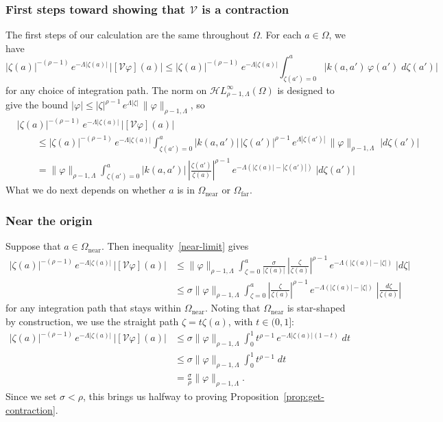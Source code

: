 \documentclass[final]{siamart220329}
\newcommand{\singexp}[2]{\mathcal{H}L^\infty_{#1, #2}}
\newcommand{\volterra}{\mathcal{V}}
\newcommand{\domain}{\Omega}
\newcommand{\near}{\Omega_\text{near}}
\newcommand{\far}{\Omega_\text{far}}
\newenvironment{revtwo}{\color{revred}}{\color{black}}
\newenvironment{revtwo}{}{}
\begin{document}
\subsubsection{First steps toward showing that $\volterra$ is a contraction}\label{first-steps}
The first steps of our calculation are the same throughout $\domain$. For each $a \in \domain$, we have
\begin{revtwo}
\[ |\zeta(a)|^{-(\rho-1)}\,e^{-\Lambda|\zeta(a)|}\,\big|[\volterra\varphi](a)\big| \le |\zeta(a)|^{-(\rho-1)}\,e^{-\Lambda|\zeta(a)|}  \int_{\zeta(a') = 0}^a |k(a, a')\,\varphi(a')\;d\zeta(a')| \]
\end{revtwo}
for any choice of integration path. The norm on $\singexp{\rho-1}{\Lambda}(\domain)$ is designed to give the bound $|\varphi| \le |\zeta|^{\rho-1}\,e^{\Lambda |\zeta|}\,\|\varphi\|_{\rho-1, \Lambda}$, so
\begin{revtwo}
\begin{align*}
&|\zeta(a)|^{-(\rho-1)}\,e^{-\Lambda|\zeta(a)|}\,\big|[\volterra\varphi](a)\big| \\
& \qquad \le |\zeta(a)|^{-(\rho-1)}\,e^{-\Lambda|\zeta(a)|}  \int_{\zeta(a') = 0}^a |k(a, a')|\,|\zeta(a')|^{\rho-1}\,e^{\Lambda |\zeta(a')|}\,\|\varphi\|_{\rho-1, \Lambda}\;|d\zeta(a')| \\
& \qquad = \|\varphi\|_{\rho-1, \Lambda}  \int_{\zeta(a') = 0}^a |k(a, a')|\,\left|\frac{\zeta(a')}{\zeta(a)}\right|^{\rho-1}\,e^{-\Lambda(|\zeta(a)| - |\zeta(a')|)}\;|d\zeta(a')|
\end{align*}
\end{revtwo}
What we do next depends on whether $a$ is in $\near$ or $\far$.
\subsubsection{Near the origin}\label{near-bound}
Suppose that $a \in \near$. Then inequality~\eqref{near-limit} gives
\begin{align*}
|\zeta(a)|^{-(\rho-1)}\,e^{-\Lambda|\zeta(a)|}\,\big|[\volterra\varphi](a)\big| & \le
\|\varphi\|_{\rho-1, \Lambda}  \int_{\zeta = 0}^a \frac{\sigma}{|\zeta(a)|}\,\left|\frac{\zeta}{\zeta(a)}\right|^{\rho-1}\,e^{-\Lambda(|\zeta(a)| - |\zeta|)}\;|d\zeta| \\
& \le \sigma \|\varphi\|_{\rho-1, \Lambda}  \int_{\zeta = 0}^a \left|\frac{\zeta}{\zeta(a)}\right|^{\rho-1}\,e^{-\Lambda(|\zeta(a)| - |\zeta|)}\;\left|\frac{d\zeta}{\zeta(a)}\right|
\end{align*}
for any integration path that stays within $\near$. Noting that $\near$ is star-shaped by construction, we use the straight path $\zeta = t \zeta(a)$, with $t \in (0, 1]$:
\begin{align*}
|\zeta(a)|^{-(\rho-1)}\,e^{-\Lambda|\zeta(a)|}\,\big|[\volterra\varphi](a)\big| & \le \sigma \|\varphi\|_{\rho-1, \Lambda} \int_0^1 t^{\rho-1}\,e^{-\Lambda |\zeta(a)|(1 - t)}\;dt \\
& \le \sigma \|\varphi\|_{\rho-1, \Lambda} \int_0^1 t^{\rho-1}\;dt \\
& = \frac{\sigma}{\rho} \|\varphi\|_{\rho-1, \Lambda}.
\end{align*}
Since we set $\sigma < \rho$, this brings us halfway to proving Proposition~\ref{prop:get-contraction}.
\end{document}
